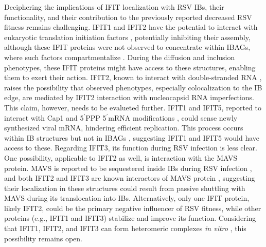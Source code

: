 Deciphering the implications of IFIT localization with RSV IBs, their functionality, and their contribution to the previously reported decreased RSV fitness remains challenging. IFIT1 and IFIT2 have the potential to interact with eukaryotic translation initiation factors \cite{Diamond2014IFIT1:Translation, Guo2000CharacterizationVirus}, potentially inhibiting their assembly, although these IFIT proteins were not observed to concentrate within IBAGs, where such factors compartmentalize \cite{Jobe2023ViralCondensates}. During the diffusion and inclusion phenotypes, these IFIT proteins might have access to these structures, enabling them to exert their action. IFIT2, known to interact with double-stranded RNA \cite{Yang2012CrystalMechanisms}, raises the possibility that observed phenotypes, especially colocalization to the IB edge, are mediated by IFIT2 interaction with nucleocapsid RNA imperfections. This claim, however, needs to be evalueted further. IFIT1 and IFIT5, reported to interact with Cap1 and 5$^{\prime}$PPP 5$^{\prime}$mRNA modifications \cite{Kumar2014InhibitionMRNAs}, could sense newly synthesized viral mRNA, hindering efficient replication. This process occurs within IB structures but not in IBAGs \cite{Rincheval2017FunctionalVirus}, suggesting IFIT1 and IFIT5 would have access to these. Regarding IFIT3, its function during RSV infection is less clear. One possibility, applicable to IFIT2 as well, is interaction with the MAVS protein. MAVS is reported to be sequestered inside IBs during RSV infection \cite{Lifland2012HumanMAVS}, and both IFIT2 and IFIT3 are known interactors of MAVS protein \cite{Chen2017InhibitionApoptosis, Diamond2013TheProteins, Liu2011IFN-InducedTBK1}, suggesting their localization in these structures could result from passive shuttling with MAVS during its translocation into IBs. Alternatively, only one IFIT protein, likely IFIT2, could be the primary negative influencer of RSV fitness, while other proteins (e.g., IFIT1 and IFIT3) stabilize and improve its function. Considering that IFIT1, IFIT2, and IFIT3 can form heteromeric complexes \textit{in vitro} \cite{Mears2018BetterResponse}, this possibility remains open.

